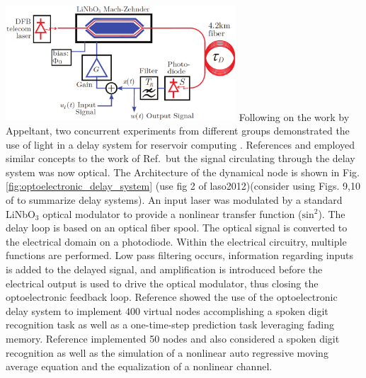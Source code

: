 \includegraphics[width=8.6cm]{figures/_optoelectronic_delay_system.pdf}
Following on the work by Appeltant, two concurrent experiments from different groups demonstrated the use of light in a delay system for reservoir computing \cite{padu2012,laso2012}. References  and  employed similar concepts to the work of Ref.\, but the signal circulating through the delay system was now optical. The Architecture of the dynamical node is shown in Fig.\,\ref{fig:optoelectronic_delay_system} (use fig 2 of laso2012)(consider using Figs. 9,10 of \cite{vabr2017} to summarize delay systems). An input laser was modulated by a standard LiNbO$_3$ optical modulator to provide a nonlinear transfer function ($\mathrm{sin}^2$). The delay loop is based on an optical fiber spool. The optical signal is converted to the electrical domain on a photodiode. Within the electrical circuitry, multiple functions are performed. Low pass filtering occurs, information regarding inputs is added to the delayed signal, and amplification is introduced before the electrical output is used to drive the optical modulator, thus closing the optoelectronic feedback loop. Reference  showed the use of the optoelectronic delay system to implement 400 virtual nodes accomplishing a spoken digit recognition task as well as a one-time-step prediction task leveraging fading memory. Reference  implemented 50 nodes and also considered a spoken digit recognition as well as the simulation of a nonlinear auto regressive moving average equation and the equalization of a nonlinear channel. 

